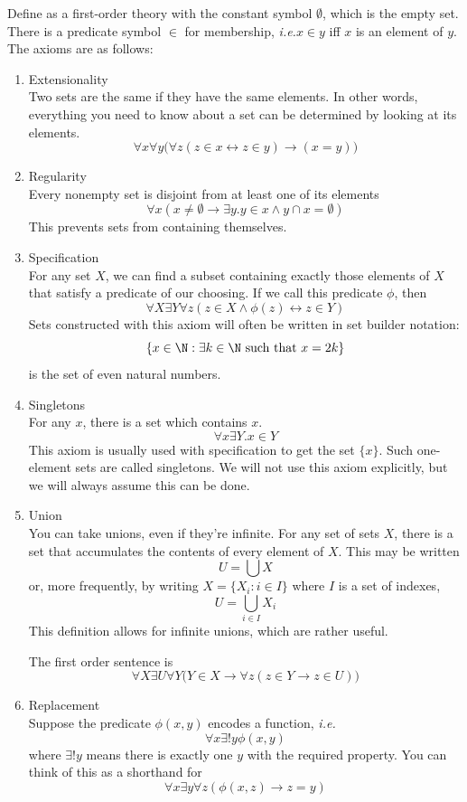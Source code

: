\documentclass{scrbook}
\renewcommand{\implies}{\to}
\renewcommand{\iff}{\leftrightarrow}
\newcommand{\ie}{\emph{i.e.}\xspace}
\begin{document}
Define \zfc as a first-order theory with the constant symbol $\emptyset$, which is the empty set. There is a predicate symbol $\in$ for membership, \ie $x\in y$ iff $x$ is an element of $y$. The axioms are as follows:
\begin{enumerate}
\item Extensionality \\
  Two sets are the same if they have the same elements. In other words, everything you need to know about a set can be determined by looking at its elements.
  \[
  \forall x \forall y  \bigl(\forall z(z\in x \iff z \in y)\implies (x=y)\bigr)
  \]
  \label{extensionality}
\item Regularity \\  
  Every nonempty set is disjoint from at least one of its elements
  \[
  \forall x (x\neq \emptyset \implies \exists y . y\in x \wedge y\cap x = \emptyset)
  \]
  This prevents sets from containing themselves. \label{zfc:reg} 
\item Specification\label{zfc:spec} \\ 
  For any set $X$, we can find a subset containing exactly those elements of $X$ that satisfy a predicate of our choosing. If we call this predicate $\phi$, then
  \[
  \forall X \exists Y \forall z  (z\in X \wedge \phi(z) \iff z\in Y)
  \]
  Sets constructed with this axiom will often be written in set builder notation:
  \[
  \{x\in \N: \exists k \in \N \textrm{ such that } x=2k\}
  \]
  is the set of even natural numbers.
\item Singletons \\ 
  For any $x$, there is a set which contains $x$. 
  \[
  \forall x \exists Y . x\in Y
  \]
  This axiom is usually used with specification to get the set $\{x\}$. Such one-element sets are called singletons. 
  We will not use this axiom explicitly, but we will always assume this can be done. 
\item Union \\
  You can take unions, even if they're infinite. 
  For any set of sets $X$, there is a set that accumulates the contents of every element of $X$. This may be written
  \[
  U=\bigcup X
  \]
  or, more frequently, by writing $X=\{X_i:i\in I\}$ where $I$ is a set of indexes,
  \[
  U=\bigcup_{i\in I} X_i
  \]
  This definition allows for infinite unions, which are rather useful. 
  
  The first order sentence is
  \[
  \forall X\exists U \forall Y \bigl(Y\in X \implies \forall z (z\in Y \implies z\in U)\bigr)
  \]
\item Replacement \\ 
  Suppose the predicate $\phi(x,y)$ encodes a function, \ie 
  \[
  \forall x \exists! y \phi(x,y)
  \]
  where $\exists!y$ means there is exactly one $y$ with the required property. You can think of this as a shorthand for
  \[
  \forall x \exists y \forall z (\phi(x,z)\implies z=y)
  \]
  

\end{enumerate}
\end{document}
